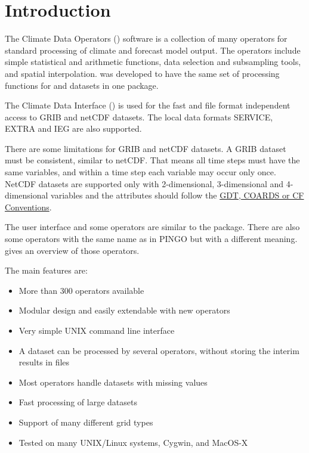 \chapter{Introduction}

The Climate Data Operators ({\CDO}) software is a collection of many operators
for standard processing of climate and forecast model output.
The operators include simple statistical and arithmetic functions, data selection
and subsampling tools, and spatial interpolation.
{\CDO} was developed to have the same set of processing functions for  and 
datasets in one package.

The Climate Data Interface () is used for the fast and file format
independent access to GRIB and netCDF datasets.
The local data formats SERVICE, EXTRA and IEG are also supported.

There are some limitations for GRIB and netCDF datasets.
A GRIB dataset must be consistent, similar to netCDF.
That means all time steps must have the same variables, and
within a time step each variable may occur only once.
NetCDF datasets are supported only with 2-dimensional, 3-dimensional and 4-dimensional
variables and the attributes should follow the
\href{http://ftp.unidata.ucar.edu/software/netcdf/docs/conventions.html}
     {GDT, COARDS or CF Conventions}.

The user interface and some operators are similar to the  package.
There are also some operators with the same name as in PINGO but with a 
different meaning.  gives an overview of 
those operators.

The main {\CDO} features are:
\begin{itemize}
\item More than 300 operators available
\item Modular design and easily extendable with new operators
\item Very simple UNIX command line interface
\item A dataset can be processed by several operators,
      without storing the interim results in files %
\item Most operators handle datasets with missing values
\item Fast processing of large datasets
\item Support of many different grid types
\item Tested on many UNIX/Linux systems, Cygwin, and MacOS-X
\end{itemize}












